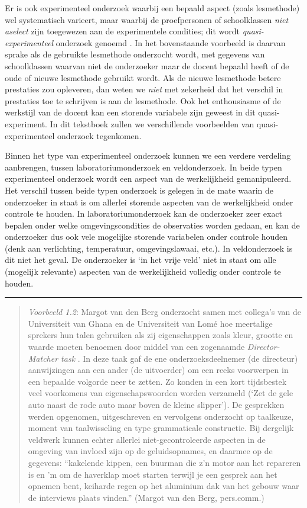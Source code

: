 \documentclass[
]{book}
\begin{document}
Er is ook experimenteel onderzoek waarbij een bepaald aspect (zoals
lesmethode) wel systematisch varieert, maar waarbij de proefpersonen of
schoolklassen \emph{niet aselect} zijn toegewezen aan de experimentele
condities; dit wordt \emph{quasi-experimenteel} onderzoek genoemd \citep{SCC02}.
In het bovenstaande voorbeeld is daarvan sprake als de gebruikte
lesmethode onderzocht wordt, met gegevens van schoolklassen waarvan niet
de onderzoeker maar de docent bepaald heeft of de oude of nieuwe
lesmethode gebruikt wordt. Als de nieuwe lesmethode betere prestaties
zou opleveren, dan weten we \emph{niet} met zekerheid dat het verschil in
prestaties toe te schrijven is aan de lesmethode. Ook het enthousiasme
of de werkstijl van de docent kan een storende variabele zijn geweest in dit quasi-experiment. In dit tekstboek zullen we verschillende
voorbeelden van quasi-experimenteel onderzoek tegenkomen.

Binnen het type van experimenteel onderzoek kunnen we een verdere
verdeling aanbrengen, tussen laboratoriumonderzoek en veldonderzoek. In
beide typen experimenteel onderzoek wordt een aspect van de
werkelijkheid gemanipuleerd. Het verschil tussen beide typen onderzoek
is gelegen in de mate waarin de onderzoeker in staat is om allerlei
storende aspecten van de werkelijkheid onder controle te houden. In
laboratoriumonderzoek kan de onderzoeker zeer exact bepalen onder welke
omgevingscondities de observaties worden gedaan, en kan de onderzoeker
dus ook vele mogelijke storende variabelen onder controle houden (denk
aan verlichting, temperatuur, omgevingslawaai, etc.). In veldonderzoek
is dit niet het geval. De onderzoeker is `in het vrije veld' niet in
staat om alle (mogelijk relevante) aspecten van de werkelijkheid
volledig onder controle te houden.

\begin{center}\rule{0.5\linewidth}{0.5pt}\end{center}

\begin{quote}
\emph{Voorbeeld 1.2}: Margot van den Berg
onderzocht samen met collega's van de Universiteit van Ghana en de
Universiteit van Lomé hoe meertalige sprekers hun talen gebruiken als
zij eigenschappen zoals kleur, grootte en waarde moeten benoemen door
middel van een zogenaamde \emph{Director-Matcher task} \citep{BAEYT2017}. In deze
taak gaf de ene onderzoeksdeelnemer (de directeur) aanwijzingen aan een
ander (de uitvoerder) om een reeks voorwerpen in een bepaalde volgorde
neer te zetten. Zo konden in een kort tijdsbestek veel voorkomens van
eigenschapswoorden worden verzameld (`Zet de gele auto naast de rode
auto maar boven de kleine slipper'). De gesprekken werden opgenomen,
uitgeschreven en vervolgens onderzocht op taalkeuze, moment van
taalwisseling en type grammaticale constructie. Bij dergelijk veldwerk
kunnen echter allerlei niet-gecontroleerde aspecten in de omgeving van
invloed zijn op de geluidsopnames, en daarmee op de gegevens: ``kakelende kippen, een buurman die z'n motor aan het repareren is en 'm om de haverklap moet starten terwijl je een gesprek aan het opnemen bent,
keiharde regen op het aluminium dak van het gebouw waar de interviews
plaats vinden.'' (Margot van den Berg, pers.comm.)
\end{quote}
\end{document}
